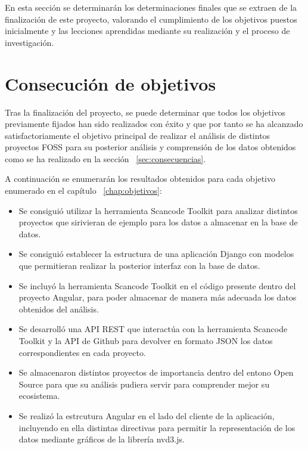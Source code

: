 \documentclass[a4paper, spanish, 12pt]{book}
\begin{document}
En esta secci\'on se determinar\'an los determinaciones finales que se extraen de
la finalizaci\'on de este proyecto, valorando el cumplimiento de los objetivos
puestos inicialmente y las lecciones aprendidas mediante su realizaci\'on y el
proceso de investigaci\'on.

\section{Consecuci\'on de objetivos}
\label{sec:consecucion-objetivos}

Tras la finalizaci\'on del proyecto, se puede determinar que todos los objetivos
previamente fijados han sido realizados con \'exito y que por tanto se ha alcanzado
satisfactoriamente el objetivo principal de realizar el an\'alisis de distintos
proyectos FOSS para su posterior an\'alisis y comprensi\'on de los datos obtenidos como
se ha realizado en la secci\'on ~\ref{sec:consecuencias}.

A continuaci\'on se enumerar\'an los resultados obtenidos para cada objetivo enumerado en
el cap\'itulo ~\ref{chap:objetivos}:

\begin{itemize}

\item Se consigui\'o utilizar la herramienta Scancode Toolkit para analizar distintos
proyectos que sirivieran de ejemplo para los datos a almacenar en la base de datos.

\item Se consigui\'o establecer la estructura de una aplicaci\'on Django con modelos
que permitieran realizar la posterior interfaz con la base de datos.

\item Se incluy\'o la herramienta Scancode Toolkit en el c\'odigo presente dentro del
proyecto Angular, para poder almacenar de manera m\'as adecuada los datos obtenidos
del an\'alisis.

\item Se desarroll\'o una API REST que interact\'ua con la herramienta Scancode Toolkit
y la API de Github para devolver en formato JSON los datos correspondientes en cada
proyecto.

\item Se almacenaron distintos proyectos de importancia dentro del entono Open Source
para que su an\'alisis pudiera servir para comprender mejor su ecosistema.

\item Se realiz\'o la estrcutura Angular en el lado del cliente de la aplicaci\'on,
incluyendo en ella distintas directivas para permitir la representaci\'on de los datos
mediante gr\'aficos de la librer\'ia nvd3.js.

\end{itemize}
\end{document}
